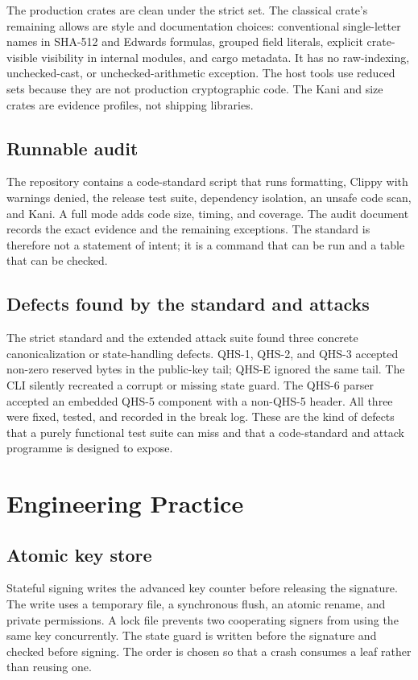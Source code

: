 \documentclass[11pt,a4paper]{article}
\begin{document}
The production crates are clean under the strict set. The classical crate's
remaining allows are style and documentation choices: conventional single-letter
names in SHA-512 and Edwards formulas, grouped field literals, explicit
crate-visible visibility in internal modules, and cargo metadata. It has no
raw-indexing, unchecked-cast, or unchecked-arithmetic exception. The host tools
use reduced sets because they are not production cryptographic code. The
Kani and size crates are evidence profiles, not shipping libraries.

\subsection{Runnable audit}

The repository contains a code-standard script that runs formatting, Clippy
with warnings denied, the release test suite, dependency isolation, an unsafe
code scan, and Kani. A full mode adds code size, timing, and coverage. The
audit document records the exact evidence and the remaining exceptions. The
standard is therefore not a statement of intent; it is a command that can be
run and a table that can be checked.

\subsection{Defects found by the standard and attacks}

The strict standard and the extended attack suite found three concrete
canonicalization or state-handling defects. QHS-1, QHS-2, and QHS-3 accepted
non-zero reserved bytes in the public-key tail; QHS-E ignored the same tail.
The CLI silently recreated a corrupt or missing state guard. The QHS-6 parser
accepted an embedded QHS-5 component with a non-QHS-5 header. All three were
fixed, tested, and recorded in the break log. These are the kind of defects
that a purely functional test suite can miss and that a code-standard and
attack programme is designed to expose.

\section{Engineering Practice}

\subsection{Atomic key store}

Stateful signing writes the advanced key counter before releasing the
signature. The write uses a temporary file, a synchronous flush, an atomic
rename, and private permissions. A lock file prevents two cooperating signers
from using the same key concurrently. The state guard is written before the
signature and checked before signing. The order is chosen so that a crash
consumes a leaf rather than reusing one.
\end{document}
